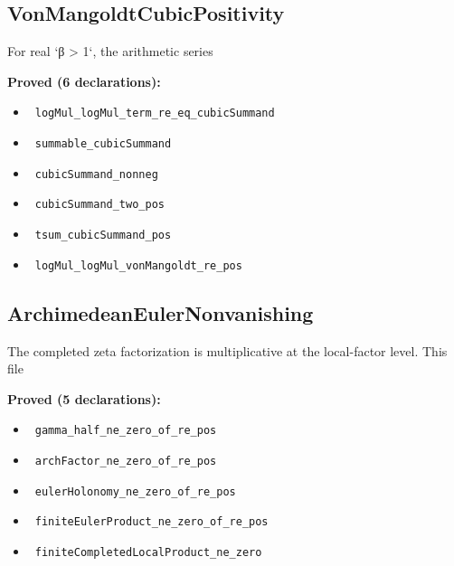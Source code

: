 \documentclass{report}
\theoremstyle{definition}
\begin{document}
\subsection{VonMangoldtCubicPositivity}
For real `β > 1`, the arithmetic series

\noindent\textbf{Proved (6 declarations):}
\begin{itemize}
  \item {}\leanok\ \texttt{logMul\_logMul\_term\_re\_eq\_cubicSummand}
  \item {}\leanok\ \texttt{summable\_cubicSummand}
  \item {}\leanok\ \texttt{cubicSummand\_nonneg}
  \item {}\leanok\ \texttt{cubicSummand\_two\_pos}
  \item {}\leanok\ \texttt{tsum\_cubicSummand\_pos}
  \item {}\leanok\ \texttt{logMul\_logMul\_vonMangoldt\_re\_pos}
\end{itemize}

\subsection{ArchimedeanEulerNonvanishing}
The completed zeta factorization is multiplicative at the local-factor level.  This file

\noindent\textbf{Proved (5 declarations):}
\begin{itemize}
  \item {}\leanok\ \texttt{gamma\_half\_ne\_zero\_of\_re\_pos}
  \item {}\leanok\ \texttt{archFactor\_ne\_zero\_of\_re\_pos}
  \item {}\leanok\ \texttt{eulerHolonomy\_ne\_zero\_of\_re\_pos}
  \item {}\leanok\ \texttt{finiteEulerProduct\_ne\_zero\_of\_re\_pos}
  \item {}\leanok\ \texttt{finiteCompletedLocalProduct\_ne\_zero}
\end{itemize}
\end{document}
